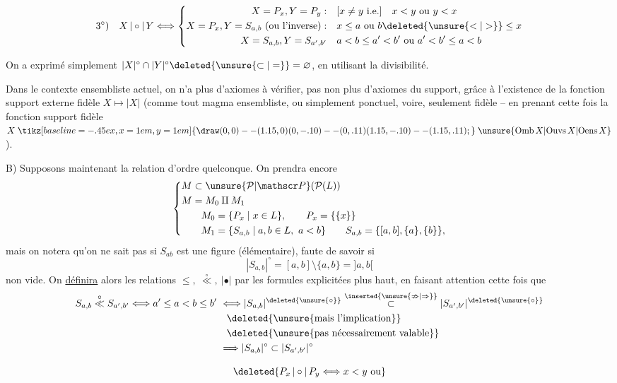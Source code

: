\[
3^\circ)\quad X\,|\circ|\,Y\Longleftrightarrow
 \left\{\begin{aligned}
 X=P_x,Y=P_y:\quad &[x\ne y\ \text{i.e.}]\quad x<y\ \text{ou}\ y<x\\
 X=P_x,Y=S_{a,b}\ (\text{ou l'inverse}):\quad &x\leq a\ \text{ou}\ b\deleted{\unsure{<|>}}\leq x\\
 X=S_{a,b},Y=S_{a',b'}\quad &a<b\leq a'<b'\ \text{ou}\ a'<b'\leq a<b
 \end{aligned}\right.
\]

On a exprimé simplement $|X|^\circ\cap|Y|^\circ\deleted{\unsure{\subset|=}}=\varnothing$, en utilisant la divisibilité.

Dans le contexte ensembliste actuel, on n'a plus d'axiomes à vérifier, pas non plus d'axiomes du support, grâce à l'existence de la fonction support externe fidèle $X\mapsto|X|$ (comme   tout magma ensembliste, ou simplement ponctuel, voire, seulement fidèle -- en prenant cette fois la fonction support fidèle $X\mathrel{\tikz[baseline=-.45ex,x=1em,y=1em]{\draw (0,0)--(1.15,0) (0,-.10)--(0,.11) (1.15,-.10)--(1.15,.11);}}\unsure{\mathrm{Omb}\,X|\mathrm{Ouvs}\,X|\mathrm{Oens}\,X}$).

B) Supposons maintenant la relation d'ordre quelconque. On prendra encore
\[
\left\{\begin{aligned}
 &M\subset\unsure{\mathcal P|\mathscr P}(\mathcal P(L))\\
 &M=M_0\amalg M_1\\
 &\qquad M_0=\{P_x\mid x\in L\},\qquad P_x=\{\{x\}\}\\
 &\qquad M_1=\{S_{a,b}\mid a,b\in L,\ a<b\}\qquad
 S_{a,b}=\{[a,b],\{a\},\{b\}\},
\end{aligned}\right.
\]
mais on notera qu'on ne sait pas si $S_{ab}$ est une figure (élémentaire), faute de savoir si
\[
 |S_{a,b}|^\circ=[a,b]\setminus\{a,b\}=]a,b[
\]
 non vide. On \uline{définira} alors les relations $\leq,\ \overset{\circ}{\ll},\ |\bullet|$ par les formules explicitées plus haut, en faisant attention cette fois que
\[
\begin{aligned}
 S_{a,b}\overset{\circ}{\ll}S_{a',b'}\Longleftrightarrow a'\leq a<b\leq b'
 &\ \Longleftrightarrow |S_{a,b}|^{\deleted{\unsure{\circ}}}\overset{\inserted{\unsure{\nRightarrow|\Rightarrow}}}{\subset}|S_{a',b'}|^{\deleted{\unsure{\circ}}}\\
 &\quad\deleted{\text{\unsure{mais l'implication}}}\\
 &\quad\deleted{\text{\unsure{pas nécessairement valable}}}\\
 &\ \Longrightarrow |S_{a,b}|^\circ\subset|S_{a',b'}|^\circ
\end{aligned}
\]

\[
\deleted{P_x\,|\circ|\,P_y\Longleftrightarrow x<y\ \text{ou}}
\]


